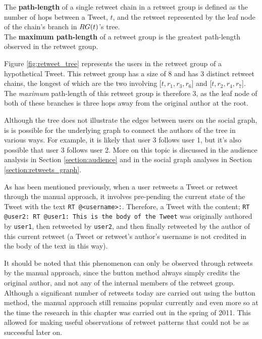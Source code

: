 \begin{mydefinition}
\label{definition:path_length}
The \textbf{path-length} of a single retweet chain in a retweet group is defined as the number of hops between a Tweet, $t$, and the retweet represented by the leaf node of the chain's branch in $RG(t)$'s tree.\\
The \textbf{maximum path-length} of a retweet group is the greatest path-length observed in the retweet group.
\end{mydefinition}

Figure \ref{fig:retweet_tree} represents the users in the retweet group of a hypothetical Tweet. This retweet group has a size of 8 and has 3 distinct retweet chains, the longest of which are the two involving [$t, r_1, r_3, r_6$] and [$t, r_2, r_4, r_7$]. The \textit{maximum} path-length of this retweet group is therefore 3, as the leaf node of both of these branches is three hops away from the original author at the root.

Although the tree does not illustrate the edges between users on the social graph, is is possible for the underlying graph to connect the authors of the tree in various ways. For example, it is likely that user 3 follows user 1, but it's also possible that user 3 follows user 2. More on this topic is discussed in the audience analysis in Section \ref{section:audience} and in the social graph analyses in Section  \ref{section:retweets_graph}.

As has been mentioned previously, when a user retweets a Tweet or retweet through the manual approach, it involves pre-pending the current state of the Tweet with the text \texttt{RT @<username>:}. Therefore, a Tweet with the content;\newline
\texttt{RT @user2: RT @user1: This is the body of the Tweet}\newline
was originally authored by \texttt{user1}, then retweeted by \texttt{user2}, and then finally retweeted by the author of this current retweet (a Tweet or retweet's author's username is not credited in the body of the text in this way).

It should be noted that this phenomenon can only be observed through retweets by the manual approach, since the button method always simply credits the original author, and not any of the internal members of the retweet group. Although a significant number of retweets today are carried out using the button method, the manual approach still remains popular currently and even more so at the time the research in this chapter was carried out in the spring of 2011. This allowed for making useful observations of retweet patterns that could not be as successful later on.


